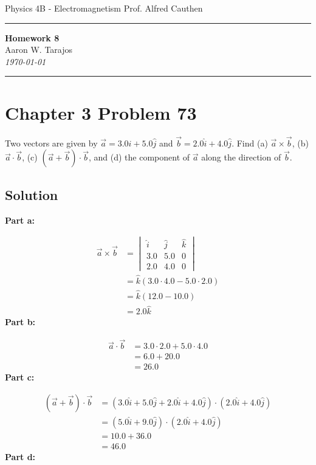 \documentclass{article}
\begin{document}
\noindent
Physics 4B - Electromagnetism \hfill Prof. Alfred Cauthen
\noindent\rule{\textwidth}{0.4pt}

\begin{center}
    \textbf{\LARGE Homework 8} \\
    \vspace{12pt}
    \large Aaron W. Tarajos \\
    \textit{\today}
\end{center}

\noindent\rule{\textwidth}{0.4pt}

\section*{Chapter 3 Problem 73}
Two vectors are given by $\vec{a} = 3.0\hat{i} + 5.0\hat{j}$ and $\vec{b} = 2.0\hat{i} + 4.0\hat{j}$.
Find (a) $\vec{a} \times \vec{b}$, 
(b) $\vec{a} \cdot \vec{b}$, 
(c) $(\vec{a} + \vec{b}) \cdot \vec{b}$, and
(d) the component of $\vec{a}$ along the direction of $\vec{b}$.

\subsection*{Solution}
\textbf{Part a:}

\begin{align*}
\vec{a} \times \vec{b} &= \begin{vmatrix}
    \hat{i} & \hat{j} & \hat{k} \\
    3.0 & 5.0 & 0 \\
    2.0 & 4.0 & 0
\end{vmatrix} \\ 
&= \hat{k}(3.0 \cdot 4.0 - 5.0 \cdot 2.0) \\
&= \hat{k}(12.0 - 10.0) \\
&= \boxed{2.0\hat{k}}
\end{align*}
\textbf{Part b:}

\begin{align*}
\vec{a} \cdot \vec{b} &= 3.0 \cdot 2.0 + 5.0 \cdot 4.0 \\
&= 6.0 + 20.0 \\
&= \boxed{26.0}
\end{align*}
\textbf{Part c:}

\begin{align*}
(\vec{a} + \vec{b}) \cdot \vec{b} &= (3.0\hat{i} + 5.0\hat{j} + 2.0\hat{i} + 4.0\hat{j}) \cdot (2.0\hat{i} + 4.0\hat{j}) \\
&= (5.0\hat{i} + 9.0\hat{j}) \cdot (2.0\hat{i} + 4.0\hat{j}) \\
&= 10.0 + 36.0 \\
&= \boxed{46.0}
\end{align*}
\textbf{Part d:}
\end{document}

